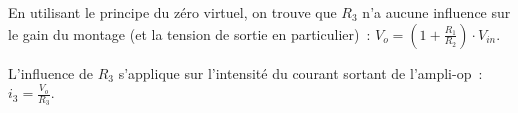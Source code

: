 \documentclass{../../template/tp}
\begin{document}
{
    En utilisant le principe du zéro virtuel, on trouve que $R_3$ n'a aucune influence sur le gain du montage (et la tension de sortie en particulier)~: $V_o = (1+ \frac{R_1}{R_2}) \cdot V_{in}$.

    L'influence de $R_3$ s'applique sur l'intensité du courant sortant de l'ampli-op~: $i_3 = \frac{V_o}{R_3}$.
}
\end{document}
